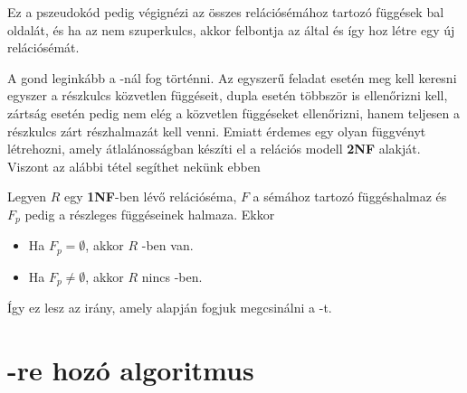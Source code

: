 \hfill \break
Ez a pszeudokód pedig végignézi az összes relációsémához tartozó függések bal oldalát, és ha az nem szuperkulcs, akkor felbontja az által és így hoz létre egy új relációsémát. \par
A gond leginkább a \nfk-nál fog történni. Az egyszerű feladat esetén meg kell keresni egyszer a részkulcs közvetlen függéseit, dupla esetén többször is ellenőrizni kell, zártság esetén pedig nem elég a közvetlen függéseket ellenőrizni, hanem teljesen a részkulcs zárt részhalmazát kell venni. Emiatt érdemes egy olyan függvényt létrehozni, amely átlalánosságban készíti el a relációs modell \textbf{2NF} alakját. Viszont az alábbi tétel segíthet nekünk ebben

\begin{tet}
Legyen $R$ egy \textbf{1NF}-ben lévő relációséma, $F$ a sémához tartozó függéshalmaz és $F_p$ pedig a részleges függéseinek halmaza. Ekkor
\begin{itemize}
    \item Ha $F_p = \emptyset$, akkor $R$ \nfk-ben van.
    \item Ha $F_p \not = \emptyset$, akkor $R$ nincs \nfk-ben.
\end{itemize}
\end{tet}

Így ez lesz az irány, amely alapján fogjuk megcsinálni a \nfk-t.

\section{\nfk-re hozó algoritmus}

